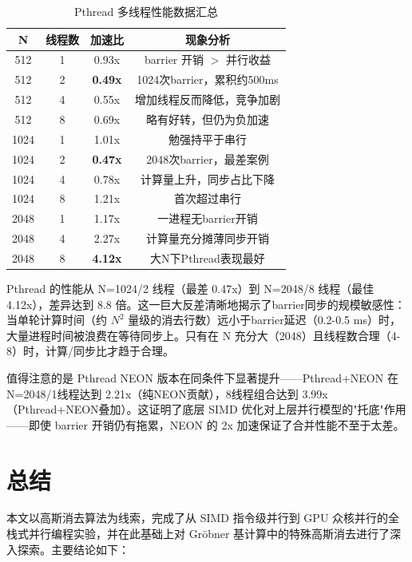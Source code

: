 \documentclass[a4paper]{article}
\begin{document}
\begin{table}[H]
  \centering
  \caption{Pthread 多线程性能数据汇总}
  \label{table:pthread_detail}
  \begin{tabular}{|c|c|c|c|}
  \hline
  \textbf{N} & \textbf{线程数} & \textbf{加速比} & \textbf{现象分析} \\
  \hline
  512 & 1 & 0.93x & barrier 开销 $>$ 并行收益 \\
  512 & 2 & \textbf{0.49x} & 1024次barrier，累积约500ms \\
  512 & 4 & 0.55x & 增加线程反而降低，竞争加剧 \\
  512 & 8 & 0.69x & 略有好转，但仍为负加速 \\
  1024 & 1 & 1.01x & 勉强持平于串行 \\
  1024 & 2 & \textbf{0.47x} & 2048次barrier，最差案例 \\
  1024 & 4 & 0.78x & 计算量上升，同步占比下降 \\
  1024 & 8 & 1.21x & 首次超过串行 \\
  2048 & 1 & 1.17x & 一进程无barrier开销 \\
  2048 & 4 & 2.27x & 计算量充分摊薄同步开销 \\
  2048 & 8 & \textbf{4.12x} & 大N下Pthread表现最好 \\
  \hline
  \end{tabular}
\end{table}

Pthread 的性能从 N=1024/2 线程（最差 0.47x）到 N=2048/8 线程（最佳 4.12x），差异达到 8.8 倍。这一巨大反差清晰地揭示了barrier同步的规模敏感性：当单轮计算时间（约 $N^2$ 量级的消去行数）远小于barrier延迟（0.2-0.5 ms）时，大量进程时间被浪费在等待同步上。只有在 N 充分大（2048）且线程数合理（4-8）时，计算/同步比才趋于合理。

值得注意的是 Pthread NEON 版本在同条件下显著提升——Pthread+NEON 在 N=2048/1线程达到 2.21x（纯NEON贡献），8线程组合达到 3.99x（Pthread+NEON叠加）。这证明了底层 SIMD 优化对上层并行模型的"托底"作用——即使 barrier 开销仍有拖累，NEON 的 2x 加速保证了合并性能不至于太差。

\section{总结}

本文以高斯消去算法为线索，完成了从 SIMD 指令级并行到 GPU 众核并行的全栈式并行编程实验，并在此基础上对 Gröbner 基计算中的特殊高斯消去进行了深入探索。主要结论如下：
\end{document}
